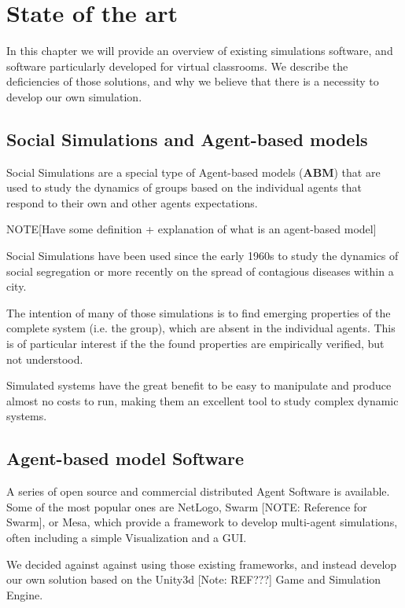 \label{StateOfTheArt}
\chapter{State of the art}
In this chapter we will provide an overview of existing simulations software, and
software particularly developed for virtual classrooms. We describe the deficiencies
of those solutions, and why we believe that there is a necessity to develop our
own simulation.

\section{Social Simulations and Agent-based models}
Social Simulations are a special type of Agent-based models (\textbf{ABM}) that are used to study
the dynamics of groups based on the individual agents that respond to their own
and other agents expectations\cite{Helbing2012}.

NOTE[Have some definition + explanation of what is an agent-based model]

\bb

Social Simulations have been used since the early 1960s to study the dynamics of
social segregation\cite{Schelling1971} or more recently on the spread of
contagious diseases\cite{Perez2009} within a city.

The intention of many of those simulations is to find emerging properties of
the complete system (i.e. the group), which are absent in the individual agents\cite{Jackson2017}.
This is of particular interest if the the found properties are empirically verified,
but not understood. 

Simulated systems have the great benefit to be easy to manipulate and produce almost
no costs to run, making them an excellent tool to study complex dynamic systems.

\section{Agent-based model Software}
A series of open source and commercial distributed Agent Software\cite{Kravi2015}
is available. Some of the most popular ones are NetLogo\cite{Tissue2004},
Swarm [NOTE: Reference for Swarm], or Mesa\cite{Masad2015}, which provide a framework
to develop multi-agent simulations, often including a simple Visualization and
a GUI.

\bb

We decided against against using those existing frameworks, and instead develop
our own solution based on the Unity3d [Note: REF???] Game and Simulation
Engine.

